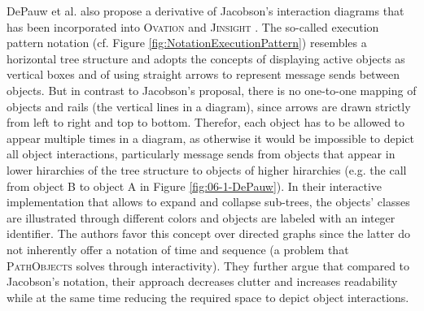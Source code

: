 DePauw et al. also propose a derivative of Jacobson's interaction diagrams \cite{de_pauw_execution_1998, jacobson_object-oriented_2004} that has been incorporated into \textsc{Ovation} \cite{de_pauw_visualizing_1993, tokoro_modeling_1994} and \textsc{Jinsight} \cite{de_pauw_visualizing_1998}.
The so-called execution pattern notation (cf. Figure \ref{fig:NotationExecutionPattern}) resembles a horizontal tree structure and adopts the concepts of displaying active objects as vertical boxes and of using straight arrows to represent message sends between objects.
But in contrast to Jacobson's proposal, there is no one-to-one mapping of objects and rails (the vertical lines in a diagram), since arrows are drawn strictly from left to right and top to bottom.
Therefor, each object has to be allowed to appear multiple times in a diagram, as otherwise it would be impossible to depict all object interactions, particularly message sends from objects that appear in lower hirarchies of the tree structure to objects of higher hirarchies (e.g. the call from object B to object A in Figure \ref{fig:06-1-DePauw}).
In their interactive implementation that allows to expand and collapse sub-trees, the objects' classes are illustrated through different colors and objects are labeled with an integer identifier.
The authors favor this concept over directed graphs since the latter do not inherently offer a notation of time and sequence (a problem that \textsc{PathObjects} solves through interactivity).
They further argue that compared to Jacobson's notation, their approach decreases clutter and increases readability while at the same time reducing the required space to depict object interactions.

